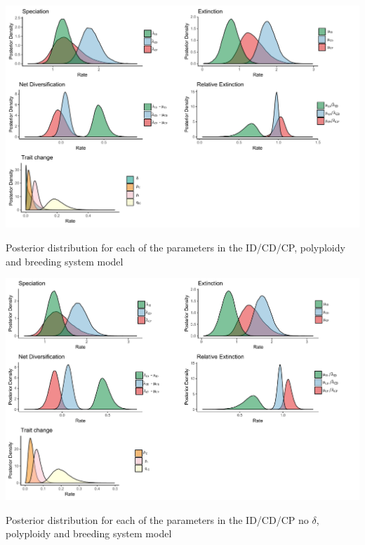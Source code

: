 \begin{suppfigure}
\includegraphics[width=\textwidth]{musseDPSIposteriordist.pdf}
\caption{Posterior distribution for each of the parameters in the ID/CD/CP, polyploidy and breeding system model} %
\label{suppfigure:IDCDCP}
\end{suppfigure}

\begin{suppfigure}
\includegraphics[width=\textwidth]{musseDPSInodipposteriordist.pdf}
\caption{Posterior distribution for each of the parameters in the ID/CD/CP no $\delta$, polyploidy and breeding system model} %
\label{suppfigure:IDCDCPnodip}
\end{suppfigure}

